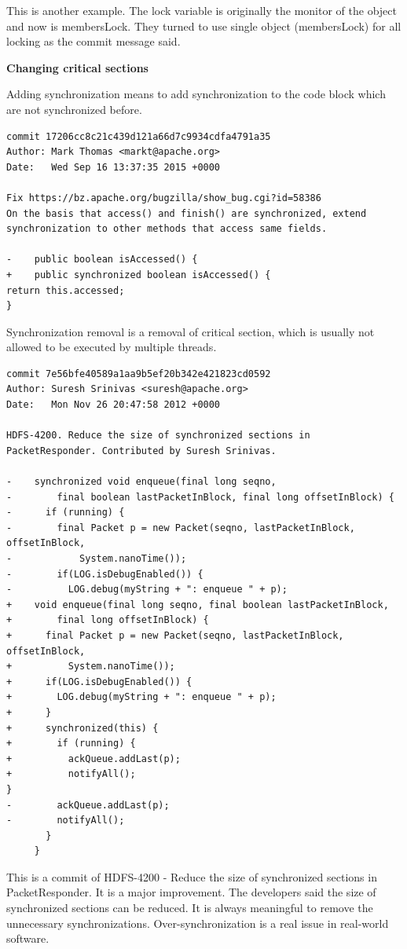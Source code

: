 \documentclass[conference]{IEEEtran}
\begin{document}
This is another example. The lock variable is originally the monitor of the object and now is membersLock. They turned to use single object (membersLock) for all locking as the commit message said. 

\textbf{Changing critical sections}

Adding synchronization means to add synchronization to the code block which are not synchronized before.

\begin{lstlisting}
commit 17206cc8c21c439d121a66d7c9934cdfa4791a35
Author: Mark Thomas <markt@apache.org>
Date:   Wed Sep 16 13:37:35 2015 +0000

Fix https://bz.apache.org/bugzilla/show_bug.cgi?id=58386
On the basis that access() and finish() are synchronized, extend synchronization to other methods that access same fields.

-    public boolean isAccessed() {
+    public synchronized boolean isAccessed() {
return this.accessed;
}
\end{lstlisting}


Synchronization removal is a removal of critical section, which is usually not allowed to be executed by multiple threads. 

\begin{lstlisting}
commit 7e56bfe40589a1aa9b5ef20b342e421823cd0592
Author: Suresh Srinivas <suresh@apache.org>
Date:   Mon Nov 26 20:47:58 2012 +0000

HDFS-4200. Reduce the size of synchronized sections in PacketResponder. Contributed by Suresh Srinivas.

-    synchronized void enqueue(final long seqno,
-        final boolean lastPacketInBlock, final long offsetInBlock) {
-      if (running) {
-        final Packet p = new Packet(seqno, lastPacketInBlock, offsetInBlock,
-            System.nanoTime());
-        if(LOG.isDebugEnabled()) {
-          LOG.debug(myString + ": enqueue " + p);
+    void enqueue(final long seqno, final boolean lastPacketInBlock,
+        final long offsetInBlock) {
+      final Packet p = new Packet(seqno, lastPacketInBlock, offsetInBlock,
+          System.nanoTime());
+      if(LOG.isDebugEnabled()) {
+        LOG.debug(myString + ": enqueue " + p);
+      }
+      synchronized(this) {
+        if (running) {
+          ackQueue.addLast(p);
+          notifyAll();
}
-        ackQueue.addLast(p);
-        notifyAll();
       }
     }
\end{lstlisting}

This is a commit of HDFS-4200 - Reduce the size of synchronized sections in PacketResponder. It is a major improvement. The developers said the size of synchronized sections can be reduced. It is always meaningful to remove the unnecessary synchronizations. Over-synchronization \cite{conf/sigsoft/GuJSZL15} is a real issue in real-world software.
\end{document}
